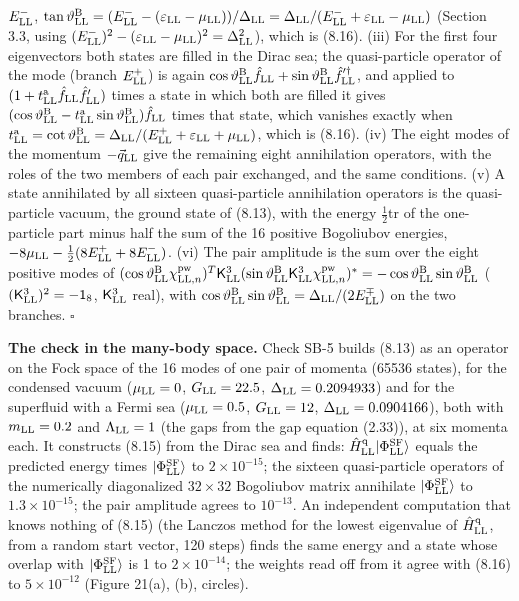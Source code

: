 \documentclass[
  10pt,
]{article}
\begin{document}
\(E^-_{\rm LL}\),
\(\tan\vartheta^{\rm B}_{\rm LL}=(E^-_{\rm LL}-(\varepsilon_{\rm LL}-\mu_{\rm LL}))/\Delta_{\rm LL}=\Delta_{\rm LL}/(E^-_{\rm LL}+\varepsilon_{\rm LL}-\mu_{\rm LL})\)
(Section 3.3, using
\((E^-_{\rm LL})^2-(\varepsilon_{\rm LL}-\mu_{\rm LL})^2=\Delta_{\rm LL}^2\)),
which is (8.16). (iii) For the first four eigenvectors both states are
filled in the Dirac sea; the quasi-particle operator of the mode (branch
\(E^+_{\rm LL}\)) is again
\(\cos\vartheta^{\rm B}_{\rm LL}\hat f_{\rm LL}+\sin\vartheta^{\rm B}_{\rm LL}\hat f'^\dagger_{\rm LL}\),
and applied to \((1+t^{\rm a}_{\rm LL}\hat f_{\rm LL}\hat f'_{\rm LL})\)
times a state in which both are filled it gives
\((\cos\vartheta^{\rm B}_{\rm LL}-t^{\rm a}_{\rm LL}\sin\vartheta^{\rm B}_{\rm LL})\hat f_{\rm LL}\)
times that state, which vanishes exactly when
\(t^{\rm a}_{\rm LL}=\cot\vartheta^{\rm B}_{\rm LL}=\Delta_{\rm LL}/(E^+_{\rm LL}+\varepsilon_{\rm LL}+\mu_{\rm LL})\),
which is (8.16). (iv) The eight modes of the momentum
\(-\vec q_{\rm LL}\) give the remaining eight annihilation operators,
with the roles of the two members of each pair exchanged, and the same
conditions. (v) A state annihilated by all sixteen quasi-particle
annihilation operators is the quasi-particle vacuum, the ground state of
(8.13), with the energy \(\tfrac12\mathrm{tr}\) of the one-particle part
minus half the sum of the 16 positive Bogoliubov energies,
\(-8\mu_{\rm LL}-\tfrac12(8E^+_{\rm LL}+8E^-_{\rm LL})\). (vi) The pair
amplitude is the sum over the eight positive modes of
\((\cos\vartheta^{\rm B}_{\rm LL}\chi^{\rm pw}_{{\rm LL},n})^T\mathsf K^3_{\rm LL}(\sin\vartheta^{\rm B}_{\rm LL}\mathsf K^3_{\rm LL}\chi^{\rm pw}_{{\rm LL},n})^*=-\cos\vartheta^{\rm B}_{\rm LL}\sin\vartheta^{\rm B}_{\rm LL}\)
(\((\mathsf K^3_{\rm LL})^2=-\mathsf 1_8\), \(\mathsf K^3_{\rm LL}\)
real), with
\(\cos\vartheta^{\rm B}_{\rm LL}\sin\vartheta^{\rm B}_{\rm LL}=\Delta_{\rm LL}/(2E^\mp_{\rm LL})\)
on the two branches. \(\square\)

\textbf{The check in the many-body space.} Check SB-5 builds (8.13) as
an operator on the Fock space of the 16 modes of one pair of momenta
(65536 states), for the condensed vacuum (\(\mu_{\rm LL}=0\),
\(G_{\rm LL}=22.5\), \(\Delta_{\rm LL}=0.2094933\)) and for the
superfluid with a Fermi sea (\(\mu_{\rm LL}=0.5\), \(G_{\rm LL}=12\),
\(\Delta_{\rm LL}=0.0904166\)), both with \(m_{\rm LL}=0.2\) and
\(\Lambda_{\rm LL}=1\) (the gaps from the gap equation (2.33)), at six
momenta each. It constructs (8.15) from the Dirac sea and finds:
\(\hat H^{\rm q}_{\rm LL}\lvert\Phi^{\rm SF}_{\rm LL}\rangle\) equals
the predicted energy times \(\lvert\Phi^{\rm SF}_{\rm LL}\rangle\) to
\(2\times10^{-15}\); the sixteen quasi-particle operators of the
numerically diagonalized \(32\times32\) Bogoliubov matrix annihilate
\(\lvert\Phi^{\rm SF}_{\rm LL}\rangle\) to \(1.3\times10^{-15}\); the
pair amplitude agrees to \(10^{-13}\). An independent computation that
knows nothing of (8.15) (the Lanczos method for the lowest eigenvalue of
\(\hat H^{\rm q}_{\rm LL}\), from a random start vector, 120 steps)
finds the same energy and a state whose overlap with
\(\lvert\Phi^{\rm SF}_{\rm LL}\rangle\) is 1 to \(2\times10^{-14}\); the
weights read off from it agree with (8.16) to \(5\times10^{-12}\)
(Figure 21(a), (b), circles).
\end{document}
